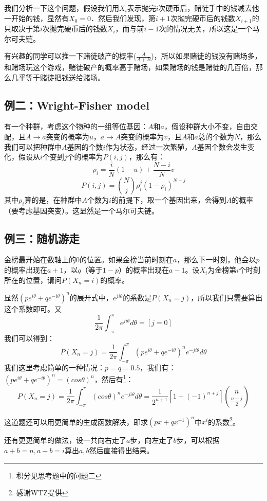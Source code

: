 		我们分析一下这个问题，假设我们用$X_i$表示抛完$i$次硬币后，赌徒手中的钱减去他一开始的钱，显然有$X_0 = 0$．然后我们发现，第$i+1$次抛完硬币后的钱数$X_{i+1}$的只取决于第$i$次抛完硬币后的钱数$X_i$，而与前$i-1$次的情况无关，所以这是一个马尔可夫链。
		
		\remark 有兴趣的同学可以推一下赌徒破产的概率($\frac{A}{A+B}$)，所以如果赌徒的钱没有赌场多，和赌场玩这个游戏，赌徒破产的概率高于赌场，如果赌场的钱是赌徒的几百倍，那么几乎等于赌徒把钱送给赌场。
		
		\subsection{例二：Wright-Fisher model}
		有一个种群，考虑这个物种的一组等位基因：$A$和$a$，假设种群大小不变，自由交配，且$A\rightarrow a$突变的概率为$u$，$a\rightarrow A$突变的概率为$v$，且$A$和$a$总的个数为$N$，那么我们可以把种群中$A$基因的个数$i$作为状态，经过一次繁殖，$A$基因个数会发生变化，假设从$i$个变到$j$个的概率为$P(i,j)$，那么有：
		$$
			\rho_i = \frac{i}{N}(1-u)+\frac{N-i}{N}v
		$$
		$$
			P(i,j) = \binom{N}{j}\rho_i^j(1-\rho_i)^{N-j}
		$$
		其中$\rho_i$算的是，在种群中$A$个数为$i$的前提下，取一个基因出来，会得到$A$的概率（要考虑基因突变）。这显然是一个马尔可夫链。
		
		\subsection{例三：随机游走}
		金榜最开始在数轴上的$0$的位置。如果金榜当前时刻在$a$，那么下一时刻，他会以$p$的概率出现在$a+1$，以$q$（等于$1-p$）的概率出现在$a-1$。设$X_i$为金榜第$i$个时刻所在的位置，请问$P(X_n = i)$的概率。
		
		\proof 显然$(pe^{i\theta}+qe^{-i\theta})^n$的展开式中，$e^{ji\theta}$的系数是$P(X_n=j)$，所以我们只需要算出这个系数即可。又
		$$
		\frac{1}{2\pi}\int_{-\pi}^{\pi}e^{ji\theta}d\theta = [j = 0]
		$$
		我们可以得到：
		$$
			P(X_n=j) = \frac{1}{2\pi}\int_{-\pi}^{\pi}(pe^{i\theta}+qe^{-i\theta})^ne^{-ji\theta}d\theta
		$$
		我们这里考虑简单的一种情况：$p = q = 0.5$，我们有：$(pe^{i\theta}+qe^{-i\theta})^n = (cos\theta)^n$，然后有\footnote{积分见思考题中的问题二}：
		$$
			P(X_n=j) = \frac{1}{2\pi}\int_{-\pi}^{\pi}(cos\theta)^ne^{-ji\theta}d\theta = \frac{1}{2^{n+1}}[1+(-1)^{n+j}]\binom{n}{\frac{n+j}{2}}
		$$
		
		\remark 这道题还可以用更简单的生成函数解决，即求$(px+qx^{-1})^n$中$x^i$的系数\footnote{感谢WTZ提供}。
		
		\remark 还有更更简单的做法，设一共向右走了$a$步，向左走了$b$步，可以根据$a+b=n,a-b=i$算出$a,b$然后直接得出结果。
		
